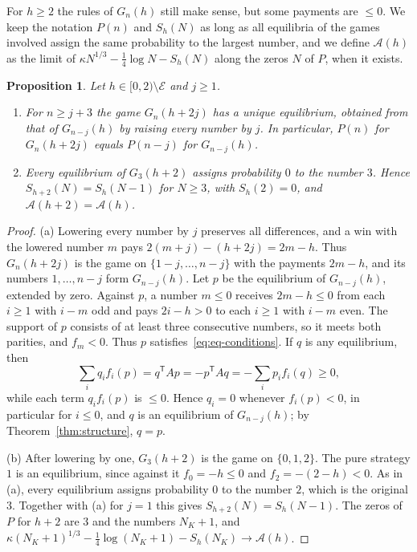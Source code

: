 \documentclass[11pt]{article}
\newtheorem{proposition}[theorem]{Proposition}
\theoremstyle{definition}
\theoremstyle{remark}
\newcommand{\Alp}{\mathcal{A}}
\begin{document}
For $h\ge2$ the rules of $G_n(h)$ still make sense, but some payments
are $\le0$. We keep the notation $P(n)$ and $S_h(N)$ as long as all
equilibria of the games involved assign the same probability to the
largest number, and we define $\Alp(h)$ as the limit of
$\kappa N^{1/3}-\frac14\log N-S_h(N)$ along the zeros $N$ of $P$, when it
exists.

\begin{proposition}\label{prop:shift}
Let $h\in[0,2)\setminus\mathcal E$ and $j\ge1$.
\begin{enumerate}
\item[(a)] For $n\ge j+3$ the game $G_n(h+2j)$ has a unique equilibrium,
obtained from that of $G_{n-j}(h)$ by raising every number by $j$. In
particular, $P(n)$ for $G_n(h+2j)$ equals $P(n-j)$ for $G_{n-j}(h)$.
\item[(b)] Every equilibrium of $G_3(h+2)$ assigns probability $0$ to the
number $3$. Hence $S_{h+2}(N)=S_h(N-1)$ for $N\ge3$, with $S_h(2)=0$, and
$\Alp(h+2)=\Alp(h)$.
\end{enumerate}
\end{proposition}

\begin{proof}
(a) Lowering every number by $j$ preserves all differences, and a win
with the lowered number $m$ pays $2(m+j)-(h+2j)=2m-h$. Thus $G_n(h+2j)$
is the game on $\{1-j,\dots,n-j\}$ with the payments $2m-h$, and its
numbers $1,\dots,n-j$ form $G_{n-j}(h)$. Let $p$ be the equilibrium of
$G_{n-j}(h)$, extended by zero. Against $p$, a number $m\le0$ receives
$2m-h\le0$ from each $i\ge1$ with $i-m$ odd and pays $2i-h>0$ to each
$i\ge1$ with $i-m$ even. The support of $p$ consists of at least three
consecutive numbers, so it meets both parities, and $f_m<0$. Thus $p$
satisfies~\eqref{eq:eq-conditions}. If $q$ is any equilibrium, then
\[
\sum_iq_if_i(p)=q^{\mathsf T}Ap=-p^{\mathsf T}Aq=-\sum_ip_if_i(q)\ge0,
\]
while each term $q_if_i(p)$ is $\le0$. Hence $q_i=0$ whenever
$f_i(p)<0$, in particular for $i\le0$, and $q$ is an equilibrium of
$G_{n-j}(h)$; by Theorem~\ref{thm:structure}, $q=p$.

(b) After lowering by one, $G_3(h+2)$ is the game on $\{0,1,2\}$. The
pure strategy $1$ is an equilibrium, since against it $f_0=-h\le0$ and
$f_2=-(2-h)<0$. As in (a), every equilibrium assigns probability $0$ to
the number $2$, which is the original $3$. Together with (a) for $j=1$
this gives $S_{h+2}(N)=S_h(N-1)$. The zeros of $P$ for $h+2$ are $3$ and
the numbers $N_K+1$, and
$\kappa(N_K+1)^{1/3}-\frac14\log(N_K+1)-S_h(N_K)\to\Alp(h)$.
\end{proof}
\end{document}
